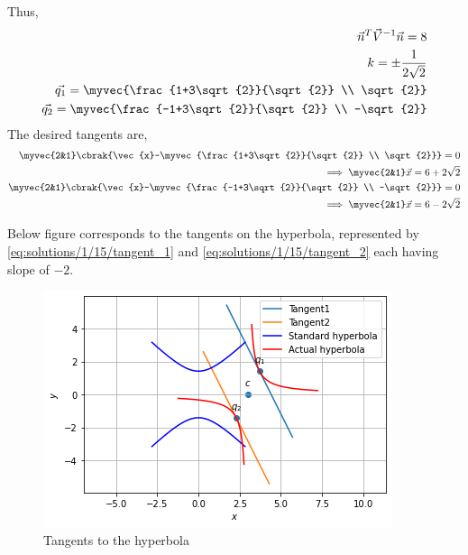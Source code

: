 Thus, 
\begin{align}
    \vec{n}^T\vec{V}^{-1}\vec{n}=8 \\
    k= \pm \frac{1}{2\sqrt{2}} \\
    \vec{q_1} = \myvec{\frac{1+3\sqrt{2}}{\sqrt{2}} \\ \sqrt{2}} \\
    \vec{q_2} = \myvec{\frac{-1+3\sqrt{2}}{\sqrt{2}} \\ -\sqrt{2}}
\end{align}
The desired tangents are, 
\begin{align}
    \myvec{2&1} \cbrak{\vec{x}-\myvec{\frac{1+3\sqrt{2}}{\sqrt{2}} \\ \sqrt{2}}} = 0 \\ 
    \implies \myvec{2&1}\vec{x} = 6+2\sqrt{2} \label{eq:solutions/1/15/tangent_1} \\
    \myvec{2&1} \cbrak{\vec{x}-\myvec{\frac{-1+3\sqrt{2}}{\sqrt{2}} \\ -\sqrt{2}}} = 0 \\
    \implies \myvec{2&1}\vec{x} = 6-2\sqrt{2}  \label{eq:solutions/1/15/tangent_2}
\end{align}

Below figure corresponds to the tangents on the hyperbola,  represented by \eqref{eq:solutions/1/15/tangent_1} and \eqref{eq:solutions/1/15/tangent_2} each having slope of $-2$. 
\begin{figure}[h!]
	\centering
	\includegraphics[width=\columnwidth]{./solutions/1/15/assignment_6.png}
	\caption{Tangents to the hyperbola}
	\label{eq:solutions/1/15/fig_1}
\end{figure}



